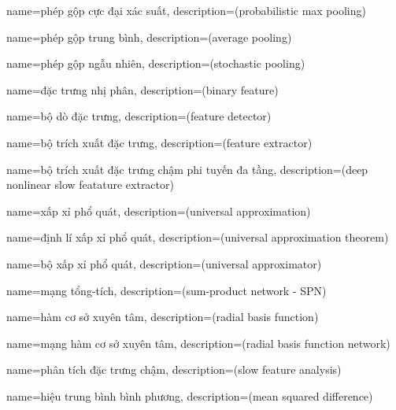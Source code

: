 {
    name={phép gộp cực đại xác suất},
    description={(probabilistic max pooling)}
}

{
    name={phép gộp trung bình},
    description={(average pooling)}
}

{
    name={phép gộp ngẫu nhiên},
    description={(stochastic pooling)}
}

{
    name={đặc trưng nhị phân},
    description={(binary feature)}
}

{
    name={bộ dò đặc trưng},
    description={(feature detector)}
}

{
    name={bộ trích xuất đặc trưng},
    description={(feature extractor)}
}

{
    name={bộ trích xuất đặc trưng chậm phi tuyến đa tầng},
    description={(deep nonlinear slow featature extractor)}
}

{
    name={xấp xỉ phổ quát},
    description={(universal approximation)}
}

{
    name={định lí xấp xỉ phổ quát},
    description={(universal approximation theorem)}
}

{
    name={bộ xấp xỉ phổ quát},
    description={(universal approximator)}
}

{
    name={mạng tổng-tích},
    description={(sum-product network - SPN)}
}


{
    name={hàm cơ sở xuyên tâm},
    description={(radial basis function)}
}


{
    name={mạng hàm cơ sở xuyên tâm},
    description={(radial basis function network)}
}

{
    name={phân tích đặc trưng chậm},
    description={(slow feature analysis)}
}


{
    name={hiệu trung bình bình phương},
    description={(mean squared difference)}
}


